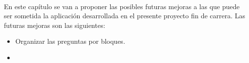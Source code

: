 \paragraph{}En este capítulo se van a proponer las posibles futuras mejoras
a las que puede ser sometida la aplicación desarrollada en el presente
proyecto fin de carrera. Las futuras mejoras son las siguientes:

\begin{itemize}
  \item Organizar las preguntas por bloques.
  \item
\end{itemize}


